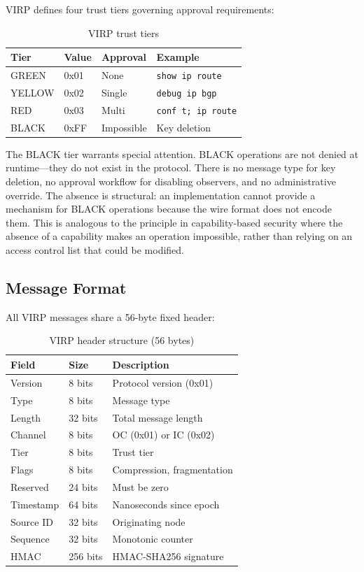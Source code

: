 \documentclass[11pt,twocolumn]{article}
\begin{document}
VIRP defines four trust tiers governing approval requirements:

\begin{table}[h]
\centering
\small
\begin{tabular}{llll}
\toprule
\textbf{Tier} & \textbf{Value} & \textbf{Approval} & \textbf{Example} \\
\midrule
GREEN & 0x01 & None & \texttt{show ip route} \\
YELLOW & 0x02 & Single & \texttt{debug ip bgp} \\
RED & 0x03 & Multi & \texttt{conf t; ip route} \\
BLACK & 0xFF & Impossible & Key deletion \\
\bottomrule
\end{tabular}
\caption{VIRP trust tiers}
\label{tab:tiers}
\end{table}

The BLACK tier warrants special attention. BLACK operations are not denied at runtime---they do not exist in the protocol. There is no message type for key deletion, no approval workflow for disabling observers, and no administrative override. The absence is structural: an implementation cannot provide a mechanism for BLACK operations because the wire format does not encode them. This is analogous to the principle in capability-based security where the absence of a capability makes an operation impossible, rather than relying on an access control list that could be modified.

\subsection{Message Format}

All VIRP messages share a 56-byte fixed header:

\begin{table}[h]
\centering
\small
\begin{tabular}{lll}
\toprule
\textbf{Field} & \textbf{Size} & \textbf{Description} \\
\midrule
Version & 8 bits & Protocol version (0x01) \\
Type & 8 bits & Message type \\
Length & 32 bits & Total message length \\
Channel & 8 bits & OC (0x01) or IC (0x02) \\
Tier & 8 bits & Trust tier \\
Flags & 8 bits & Compression, fragmentation \\
Reserved & 24 bits & Must be zero \\
Timestamp & 64 bits & Nanoseconds since epoch \\
Source ID & 32 bits & Originating node \\
Sequence & 32 bits & Monotonic counter \\
HMAC & 256 bits & HMAC-SHA256 signature \\
\bottomrule
\end{tabular}
\caption{VIRP header structure (56 bytes)}
\label{tab:header}
\end{table}
\end{document}
